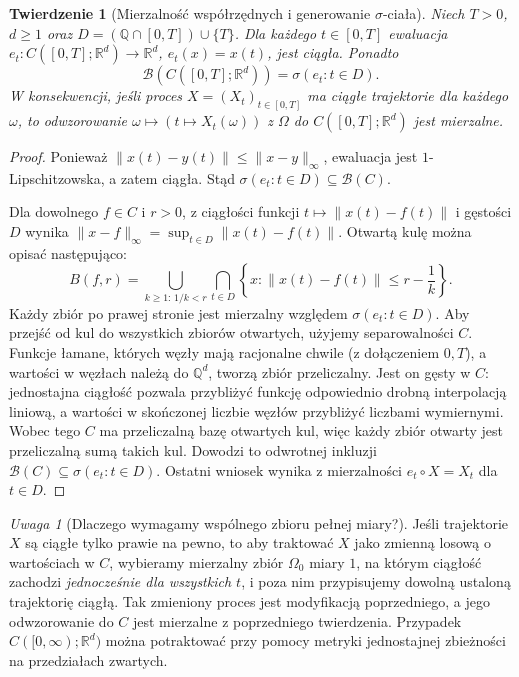 \documentclass[11pt,a4paper,oneside]{report}
\numberwithin{equation}{chapter}
\theoremstyle{plain}
\newtheorem{twierdzenie}{Twierdzenie}[chapter]
\theoremstyle{definition}
\theoremstyle{remark}
\newtheorem{uwaga}{Uwaga}[chapter]
\newcommand{\R}{\mathbb{R}}
\newcommand{\Q}{\mathbb{Q}}
\newcommand{\calB}{\mathcal{B}}
\newcommand{\norm}[1]{\lVert #1\rVert}
\begin{document}
\begin{twierdzenie}[Mierzalność współrzędnych i generowanie $\sigma$-ciała]
Niech $T>0$, $d\ge1$ oraz
$D=(\Q\cap[0,T])\cup\{T\}$.
Dla każdego $t\in[0,T]$ ewaluacja
$e_t:C([0,T];\R^d)\to\R^d$, $e_t(x)=x(t)$,
jest ciągła. Ponadto
\[
\calB(C([0,T];\R^d))=\sigma(e_t:t\in D).
\]
W konsekwencji, jeśli proces $X=(X_t)_{t\in[0,T]}$
ma ciągłe trajektorie dla każdego $\omega$, to odwzorowanie
$\omega\mapsto(t\mapsto X_t(\omega))$ z $\Omega$ do
$C([0,T];\R^d)$ jest mierzalne.
\end{twierdzenie}
\begin{proof}
Ponieważ $\norm{x(t)-y(t)}\le\norm{x-y}_\infty$,
ewaluacja jest $1$-Lipschitzowska, a zatem ciągła.
Stąd $\sigma(e_t:t\in D)\subseteq\calB(C)$.

Dla dowolnego $f\in C$ i $r>0$, z ciągłości funkcji
$t\mapsto\norm{x(t)-f(t)}$ i gęstości $D$ wynika
$\norm{x-f}_\infty=\sup_{t\in D}\norm{x(t)-f(t)}$.
Otwartą kulę można opisać następująco:
\[
B(f,r)=\bigcup_{k\ge1:\,1/k<r}
\bigcap_{t\in D}
\left\{x:\norm{x(t)-f(t)}\le r-\frac1k\right\}.
\]
Każdy zbiór po prawej stronie jest mierzalny względem
$\sigma(e_t:t\in D)$. Aby przejść od kul do wszystkich
zbiorów otwartych, użyjemy separowalności $C$.
Funkcje łamane, których węzły mają racjonalne chwile
(z dołączeniem $0,T$), a wartości w węzłach należą do
$\Q^d$, tworzą zbiór przeliczalny. Jest on gęsty w
$C$: jednostajna ciągłość pozwala przybliżyć funkcję
odpowiednio drobną interpolacją liniową, a wartości
w skończonej liczbie węzłów przybliżyć liczbami wymiernymi.
Wobec tego $C$ ma przeliczalną bazę otwartych kul,
więc każdy zbiór otwarty jest przeliczalną sumą takich kul.
Dowodzi to odwrotnej inkluzji $\calB(C)\subseteq\sigma(e_t:t\in D)$.
Ostatni wniosek wynika z mierzalności $e_t\circ X=X_t$
dla $t\in D$.
\end{proof}

\begin{uwaga}[Dlaczego wymagamy wspólnego zbioru pełnej miary?]
Jeśli trajektorie $X$ są ciągłe tylko prawie na pewno,
to aby traktować $X$ jako zmienną losową o wartościach w $C$,
wybieramy mierzalny zbiór $\Omega_0$ miary $1$, na którym
ciągłość zachodzi \emph{jednocześnie dla wszystkich $t$},
i poza nim przypisujemy dowolną ustaloną trajektorię ciągłą.
Tak zmieniony proces jest modyfikacją poprzedniego, a jego
odwzorowanie do $C$ jest mierzalne z poprzedniego twierdzenia.
Przypadek $C([0,\infty);\R^d)$ można potraktować przy pomocy
metryki jednostajnej zbieżności na przedziałach zwartych.
\end{uwaga}
\end{document}
